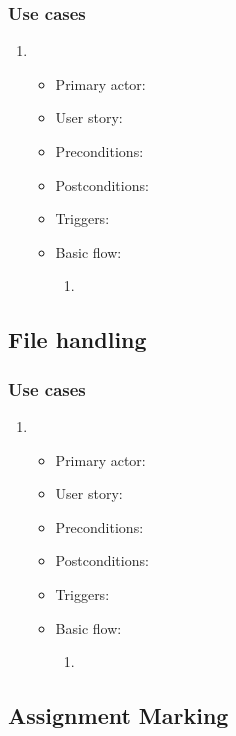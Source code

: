 \subsubsection{Use cases}
\begin{enumerate}
\item 
\begin{itemize}
    \item Primary actor:
    \item User story:
    \item Preconditions:
    \item Postconditions:
    \item Triggers:
    \item Basic flow:
        \begin{enumerate}
            \item 
        \end{enumerate}
\end{itemize}
\end{enumerate}

\subsection{File handling}
\subsubsection{Use cases}
\begin{enumerate}
\item 
\begin{itemize}
    \item Primary actor:
    \item User story:
    \item Preconditions:
    \item Postconditions:
    \item Triggers:
    \item Basic flow:
        \begin{enumerate}
            \item 
        \end{enumerate}
\end{itemize}
\end{enumerate}

\subsection{Assignment Marking}
